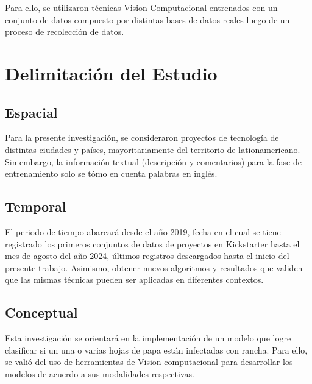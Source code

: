 Para ello, se utilizaron técnicas Vision Computacional entrenados con un conjunto de datos compuesto por distintas bases de datos reales luego de un proceso de recolección de datos.

\section{Delimitación del Estudio}

\subsection{Espacial}
Para la presente investigación, se consideraron proyectos de tecnología de distintas ciudades y países, mayoritariamente del territorio de lationamericano. Sin embargo, la información textual (descripción y comentarios) para la fase de entrenamiento solo se tómo en cuenta palabras en inglés.

\subsection{Temporal}
El periodo de tiempo abarcará desde el año 2019, fecha en el cual se tiene registrado los primeros conjuntos de datos de proyectos en Kickstarter hasta el mes de agosto del año 2024, últimos registros descargados hasta el inicio del presente trabajo. Asimismo, obtener nuevos algoritmos y resultados que validen que las mismas técnicas pueden ser aplicadas en diferentes contextos.

\subsection{Conceptual}
Esta investigación se orientará en la implementación de un modelo que logre clasificar si un una o varias hojas de papa están infectadas con rancha. Para ello, se valió del uso de herramientas de Vision computacional  para desarrollar los modelos de acuerdo a sus modalidades respectivas.